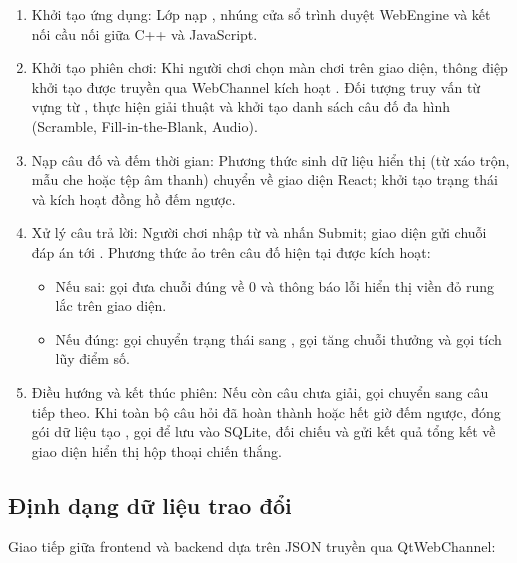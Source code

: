\begin{enumerate}
    \item Khởi tạo ứng dụng: Lớp  nạp , nhúng cửa sổ trình duyệt WebEngine và kết nối cầu nối  giữa C++ và JavaScript.
    \item Khởi tạo phiên chơi: Khi người chơi chọn màn chơi trên giao diện, thông điệp khởi tạo được truyền qua WebChannel kích hoạt . Đối tượng  truy vấn từ vựng từ , thực hiện giải thuật  và khởi tạo danh sách câu đố đa hình  (Scramble, Fill-in-the-Blank, Audio).
    \item Nạp câu đố và đếm thời gian: Phương thức  sinh dữ liệu hiển thị (từ xáo trộn, mẫu che hoặc tệp âm thanh) chuyển về giao diện React;  khởi tạo trạng thái và kích hoạt đồng hồ đếm ngược.
    \item Xử lý câu trả lời: Người chơi nhập từ và nhấn Submit; giao diện gửi chuỗi đáp án tới . Phương thức ảo  trên câu đố hiện tại được kích hoạt:
    \begin{itemize}
        \item Nếu sai:  gọi  đưa chuỗi đúng về 0 và thông báo lỗi hiển thị viền đỏ rung lắc trên giao diện.
        \item Nếu đúng:  gọi  chuyển trạng thái sang , gọi  tăng chuỗi thưởng và gọi  tích lũy điểm số.
    \end{itemize}
    \item Điều hướng và kết thúc phiên: Nếu còn câu chưa giải,  gọi  chuyển sang câu tiếp theo. Khi toàn bộ câu hỏi đã hoàn thành hoặc hết giờ đếm ngược,  đóng gói dữ liệu tạo , gọi  để lưu vào SQLite, đối chiếu  và gửi kết quả tổng kết về giao diện hiển thị hộp thoại chiến thắng.
\end{enumerate}

\subsection{Định dạng dữ liệu trao đổi}
\label{subsec:data_format}
Giao tiếp giữa frontend và backend dựa trên JSON truyền qua QtWebChannel:

